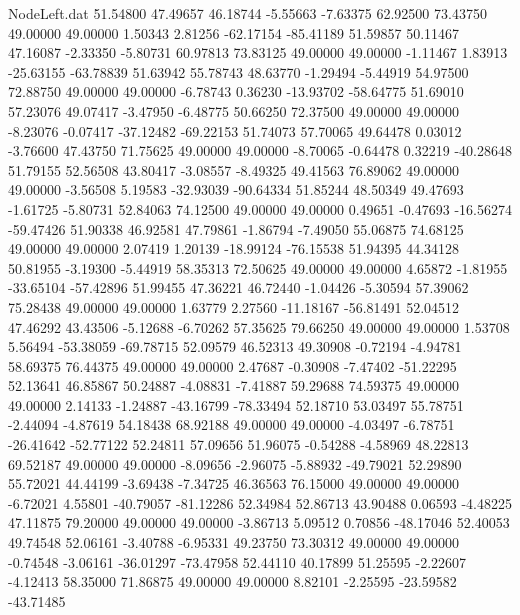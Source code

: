 \begin{filecontents}{NodeLeft.dat}
  51.54800   47.49657   46.18744    -5.55663   -7.63375   62.92500   73.43750   49.00000   49.00000    1.50343    2.81256  -62.17154  -85.41189
  51.59857   50.11467   47.16087    -2.33350   -5.80731   60.97813   73.83125   49.00000   49.00000   -1.11467    1.83913  -25.63155  -63.78839
  51.63942   55.78743   48.63770    -1.29494   -5.44919   54.97500   72.88750   49.00000   49.00000   -6.78743    0.36230  -13.93702  -58.64775
  51.69010   57.23076   49.07417    -3.47950   -6.48775   50.66250   72.37500   49.00000   49.00000   -8.23076   -0.07417  -37.12482  -69.22153
  51.74073   57.70065   49.64478     0.03012   -3.76600   47.43750   71.75625   49.00000   49.00000   -8.70065   -0.64478    0.32219  -40.28648
  51.79155   52.56508   43.80417    -3.08557   -8.49325   49.41563   76.89062   49.00000   49.00000   -3.56508    5.19583  -32.93039  -90.64334
  51.85244   48.50349   49.47693    -1.61725   -5.80731   52.84063   74.12500   49.00000   49.00000    0.49651   -0.47693  -16.56274  -59.47426
  51.90338   46.92581   47.79861    -1.86794   -7.49050   55.06875   74.68125   49.00000   49.00000    2.07419    1.20139  -18.99124  -76.15538
  51.94395   44.34128   50.81955    -3.19300   -5.44919   58.35313   72.50625   49.00000   49.00000    4.65872   -1.81955  -33.65104  -57.42896
  51.99455   47.36221   46.72440    -1.04426   -5.30594   57.39062   75.28438   49.00000   49.00000    1.63779    2.27560  -11.18167  -56.81491
  52.04512   47.46292   43.43506    -5.12688   -6.70262   57.35625   79.66250   49.00000   49.00000    1.53708    5.56494  -53.38059  -69.78715
  52.09579   46.52313   49.30908    -0.72194   -4.94781   58.69375   76.44375   49.00000   49.00000    2.47687   -0.30908   -7.47402  -51.22295
  52.13641   46.85867   50.24887    -4.08831   -7.41887   59.29688   74.59375   49.00000   49.00000    2.14133   -1.24887  -43.16799  -78.33494
  52.18710   53.03497   55.78751    -2.44094   -4.87619   54.18438   68.92188   49.00000   49.00000   -4.03497   -6.78751  -26.41642  -52.77122
  52.24811   57.09656   51.96075    -0.54288   -4.58969   48.22813   69.52187   49.00000   49.00000   -8.09656   -2.96075   -5.88932  -49.79021
  52.29890   55.72021   44.44199    -3.69438   -7.34725   46.36563   76.15000   49.00000   49.00000   -6.72021    4.55801  -40.79057  -81.12286
  52.34984   52.86713   43.90488     0.06593   -4.48225   47.11875   79.20000   49.00000   49.00000   -3.86713    5.09512    0.70856  -48.17046
  52.40053   49.74548   52.06161    -3.40788   -6.95331   49.23750   73.30312   49.00000   49.00000   -0.74548   -3.06161  -36.01297  -73.47958
  52.44110   40.17899   51.25595    -2.22607   -4.12413   58.35000   71.86875   49.00000   49.00000    8.82101   -2.25595  -23.59582  -43.71485

\end{filecontents}
